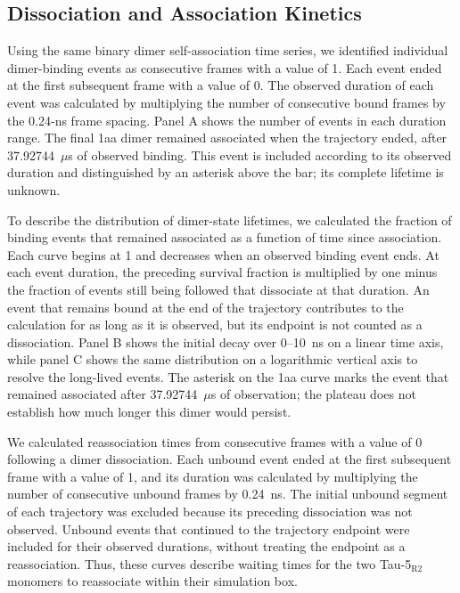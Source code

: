 \documentclass[11pt]{article}
\newcommand{\tauR}{Tau-5$_{\mathrm{R2}}$}
\begin{document}
\subsection*{Dissociation and Association Kinetics}

Using the same binary dimer self-association time series, we identified individual dimer-binding events as consecutive frames with a value of 1. Each event ended at the first subsequent frame with a value of 0. The observed duration of each event was calculated by multiplying the number of consecutive bound frames by the 0.24-ns frame spacing. Panel A shows the number of events in each duration range. The final 1aa dimer remained associated when the trajectory ended, after 37.92744~$\mu$s of observed binding. This event is included according to its observed duration and distinguished by an asterisk above the bar; its complete lifetime is unknown.

To describe the distribution of dimer-state lifetimes, we calculated the fraction of binding events that remained associated as a function of time since association. Each curve begins at 1 and decreases when an observed binding event ends. At each event duration, the preceding survival fraction is multiplied by one minus the fraction of events still being followed that dissociate at that duration. An event that remains bound at the end of the trajectory contributes to the calculation for as long as it is observed, but its endpoint is not counted as a dissociation. Panel B shows the initial decay over 0--10~ns on a linear time axis, while panel C shows the same distribution on a logarithmic vertical axis to resolve the long-lived events. The asterisk on the 1aa curve marks the event that remained associated after 37.92744~$\mu$s of observation; the plateau does not establish how much longer this dimer would persist.

We calculated reassociation times from consecutive frames with a value of 0 following a dimer dissociation. Each unbound event ended at the first subsequent frame with a value of 1, and its duration was calculated by multiplying the number of consecutive unbound frames by 0.24~ns. The initial unbound segment of each trajectory was excluded because its preceding dissociation was not observed. Unbound events that continued to the trajectory endpoint were included for their observed durations, without treating the endpoint as a reassociation. Thus, these curves describe waiting times for the two \tauR{} monomers to reassociate within their simulation box.
\end{document}
